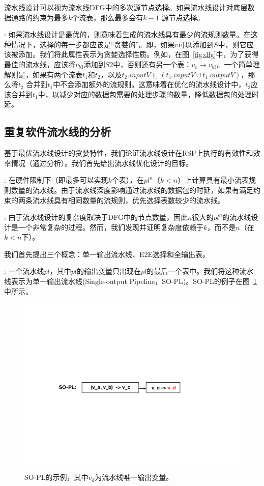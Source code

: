 流水线设计可以视为流水线DFG中的多次源节点选择。如果流水线设计对底层数据通路的约束为最多$k$个流表，那么最多会有$k-1$ 源节点选择。

: 如果流水线设计是最优的，则意味着生成的流水线具有最少的流规则数量。在这种情况下，选择的每一步都应该是``贪婪的''。即，如果$v$可以添加到$S$中，则它应该被添加。我们将此属性表示为贪婪选择性质。例如，在图~\ref{fig:dfg}中，为了获得最佳的流水线，应该将$v_{b3}$添加到$S2$中，否则还有另一个表：$v_c \rightarrow v_{b3}$。一个简单理解则是，如果有两个流表$t_1$和$t_2$，以及$t_2.inputV \subseteq (t_1.inputV \cup t_1.outputV)$，那么将$t_2$ 合并到$t_1$中不会添加额外的流规则。这意味着在优化的流水线设计中，$t_2$应该合并到$t_1$中，以减少对应的数据包需要的处理步骤的数量，降低数据包的处理时延。

\subsection{重复软件流水线的分析}
基于最优流水线设计的贪婪特性，我们论证流水线设计在RSP上执行的有效性和效率情况（通过分析）。我们首先给出流水线优化设计的目标。

: 在硬件限制下（即最多可以实现$k$个表），在$pl^n$（$k < n$）上计算具有最小流表规则数量的流水线。由于流水线深度影响通过流水线的数据包的时延，如果有满足约束的两条流水线具有相同数量的流规则，优先选择表数较少的流水线。

: 由于流水线设计的复杂度取决于DFG中的节点数量，因此$n$很大的$pl^n$的流水线设计是一个非常复杂的过程。然而，我们发现并证明复杂度依赖于$k$，而不是$n$（在$k < n$下）。

我们首先提出三个概念：单一输出流水线、E2E选择和全输出表。

: 一个流水线$pl$，其中$pl$的输出变量只出现在$pl$的最后一个表中。我们将这种流水线表示为单一输出流水线(Single-output Pipeline，SO-PL)。SO-PL的例子在图~\ref{fig:sopl}中所示。
%
\begin{figure}[!htbp]
\includegraphics[width=0.8\linewidth]{figures/lp-68.pdf}
\centering
\caption{\small SO-PL的示例，其中$v_d$为流水线唯一输出变量。}
\label{fig:sopl}
\end{figure}


